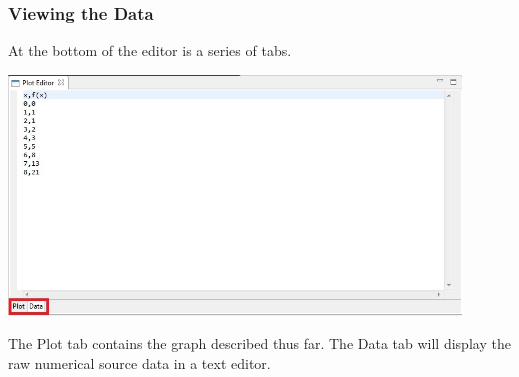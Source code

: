 \subsubsection{Viewing the Data}

At the bottom of the editor is a series of tabs.

\begin{center}
\includegraphics[width=12cm]{images/CSVTabs}
\end{center}

The Plot tab contains the graph described thus far. The Data tab will display
the raw numerical source data in a text editor. 
